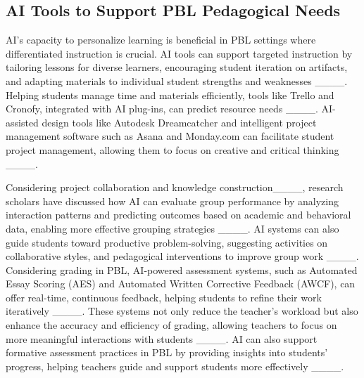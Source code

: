 \subsection{AI Tools to Support PBL Pedagogical Needs}

AI's capacity to personalize learning is beneficial in PBL settings where differentiated instruction is crucial. AI tools can support targeted instruction by tailoring lessons for diverse learners, encouraging student iteration on artifacts, and adapting materials to individual student strengths and weaknesses ____. 
Helping students manage time and materials efficiently, tools like Trello and Cronofy, integrated with AI plug-ins, can predict resource needs  ____. 
AI-assisted design tools like Autodesk Dreamcatcher and intelligent project management software such as Asana and Monday.com can facilitate student project management, allowing them to focus on creative and critical thinking ____.

Considering project collaboration and knowledge construction____, research scholars have discussed how AI can evaluate group performance by analyzing interaction patterns and predicting outcomes based on academic and behavioral data, enabling more effective grouping strategies ____. AI systems can also guide students toward productive problem-solving, suggesting activities on collaborative styles, and pedagogical interventions to improve group work ____. 
Considering grading in PBL, AI-powered assessment systems, such as Automated Essay Scoring (AES) and Automated Written Corrective Feedback (AWCF), can offer real-time, continuous feedback, helping students to refine their work iteratively ____. These systems not only reduce the teacher's workload but also enhance the accuracy and efficiency of grading, allowing teachers to focus on more meaningful interactions with students ____. AI can also support formative assessment practices in PBL by providing insights into students' progress, helping teachers guide and support students more effectively ____.

